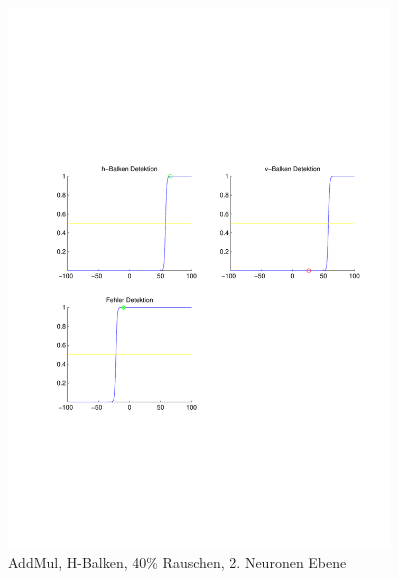\begin{figure}[hbt]
\begin{minipage}[c]{\textwidth}
		\includegraphics[trim=70 211 42 222, clip, width=0.9\textwidth]{./Bilder/Auswertung/Endergebnis/TypeAddMul_Rauschen40_H_Line_Layer2}
		\caption{AddMul, H-Balken, 40\% Rauschen, 2. Neuronen Ebene}
		\label{AddMul_H_40_2}
	\end{minipage}
\end{figure}

